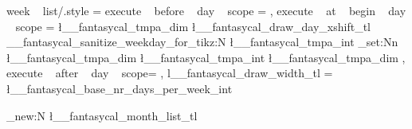 \tikzset
  {
    week ~ list/.style = 
      {
        execute ~ before ~ day ~ scope =
          {
              {
                  { 
                    \pgftransformyshift{-\pgf@y}
                  } 
              }
          }
        ,
        execute ~ at ~ begin ~ day ~ scope =
          {
            \pgfmathsetlength \l__fantasycal_tmpa_dim { \l__fantasycal_draw_day_xshift_tl}
            \__fantasycal_sanitize_weekday_for_tikz:N \l__fantasycal_tmpa_int
            \dim_set:Nn \l__fantasycal_tmpa_dim { \l__fantasycal_tmpa_int \l__fantasycal_tmpa_dim }
          }
        ,
        execute ~ after ~ day ~ scope=
          {
              {
              }
          }
        ,
        l__fantasycal_draw_width_tl = \l__fantasycal_base_nr_days_per_week_int
      }    
  }
    
    
    

%

\tl_new:N \l__fantasycal_month_list_tl

